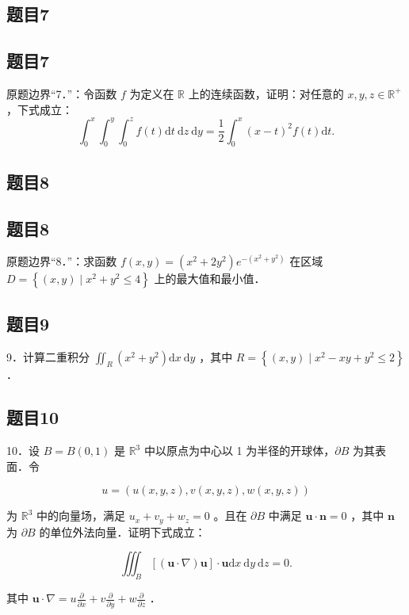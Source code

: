 \documentclass{article}
\begin{document}
\begin{itemize}

\subsection{题目7}
\end{itemize}

\subsection{题目7}
原题边界“7．”：令函数 \(f\) 为定义在 \(\mathbb{R}\) 上的连续函数，证明：对任意的 \(x, y, z \in \mathbb{R}^{+}\)，下式成立：
\[
\int_{0}^{x} \int_{0}^{y} \int_{0}^{z} f(t) \mathrm{d} t \mathrm{~d} z \mathrm{~d} y=\frac{1}{2} \int_{0}^{x}(x-t)^{2} f(t) \mathrm{d} t .
\]

\subsection{题目8}

\subsection{题目8}
原题边界“8．”：求函数 \(f(x, y)=\left(x^{2}+2 y^{2}\right) e^{-\left(x^{2}+y^{2}\right)}\) 在区域 \(D=\left\{(x, y) \mid x^{2}+y^{2} \leq 4\right\}\) 上的最大值和最小值．

\subsection{题目9}
9．计算二重积分 \(\iint_{R}\left(x^{2}+y^{2}\right) \mathrm{d} x \mathrm{~d} y\) ，其中 \(R=\left\{(x, y) \mid x^{2}-x y+y^{2} \leq 2\right\}\) ．

\subsection{题目10}
10．设 \(B=B(0,1)\) 是 \(\mathbb{R}^{3}\) 中以原点为中心以 1 为半径的开球体，\(\partial B\) 为其表面．令

\[
u=(u(x, y, z), v(x, y, z), w(x, y, z))
\]

为 \(\mathbb{R}^{3}\) 中的向量场，满足 \(u_{x}+v_{y}+w_{z}=0\) 。且在 \(\partial B\) 中满足 \(\mathbf{u} \cdot \mathbf{n}=0\) ，其中 \(\mathbf{n}\) 为 \(\partial B\) 的单位外法向量．证明下式成立：

\[
\iiint_{B}[(\mathbf{u} \cdot \nabla) \mathbf{u}] \cdot \mathbf{u} \mathrm{d} x \mathrm{~d} y \mathrm{~d} z=0 .
\]

其中 \(\mathbf{u} \cdot \nabla=u \frac{\partial}{\partial x}+v \frac{\partial}{\partial y}+w \frac{\partial}{\partial z}\) ．
\end{document}
